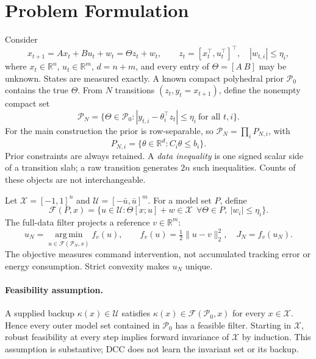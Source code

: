 \documentclass{l4dc2026}
\newcommand{\R}{\mathbb{R}}
\newcommand{\PN}{\mathcal P_N}
\newcommand{\U}{\mathcal U}
\newcommand{\X}{\mathcal X}
\newcommand{\F}{\mathcal F}
\newcommand{\argmin}{\operatorname*{arg\,min}}
\begin{document}
\section{Problem Formulation}
Consider
\begin{equation}\label{eq:dynamics}
 x_{t+1}=Ax_t+Bu_t+w_t=\Theta z_t+w_t,\qquad
 z_t=[x_t^\top,u_t^\top]^\top,\quad |w_{t,i}|\leq\eta_i,
\end{equation}
where $x_t\in\R^n$, $u_t\in\R^m$, $d=n+m$, and every entry of $\Theta=[A\ B]$ may be unknown. States are measured exactly. A known compact polyhedral prior $\mathcal P_0$ contains the true $\Theta$. From $N$ transitions $(z_t,y_t=x_{t+1})$, define the nonempty compact set
\begin{equation}\label{eq:set}
 \PN=\{\Theta\in\mathcal P_0:|y_{t,i}-\theta_i^\top z_t|\leq\eta_i\ \text{for all }t,i\}.
\end{equation}
For the main construction the prior is row-separable, so $\PN=\prod_i P_{N,i}$, with
\begin{equation}\label{eq:row}
 P_{N,i}=\{\theta\in\R^d:C_i\theta\leq b_i\}.
\end{equation}
Prior constraints are always retained. A \emph{data inequality} is one signed scalar side of a transition slab; a raw transition generates $2n$ such inequalities. Counts of these objects are not interchangeable.

Let $\X=[-1,1]^n$ and $\U=[-\bar u,\bar u]^m$. For a model set $P$, define
\begin{equation}\label{eq:feasible}
 \F(P,x)=\{u\in\U:\Theta[x;u]+w\in\X\ \ \forall\Theta\in P,\ |w_i|\leq\eta_i\}.
\end{equation}
The full-data filter projects a reference $v\in\R^m$:
\begin{equation}\label{eq:filter}
 u_N=\argmin_{u\in\F(\PN,x)}f_v(u),\qquad
 f_v(u)=\tfrac12\|u-v\|_2^2,\quad J_N=f_v(u_N).
\end{equation}
The objective measures command intervention, not accumulated tracking error or energy consumption. Strict convexity makes $u_N$ unique.

\paragraph{Feasibility assumption.}
A supplied backup $\kappa(x)\in\U$ satisfies $\kappa(x)\in\F(\mathcal P_0,x)$ for every $x\in\X$. Hence every outer model set contained in $\mathcal P_0$ has a feasible filter. Starting in $\X$, robust feasibility at every step implies forward invariance of $\X$ by induction. This assumption is substantive; DCC does not learn the invariant set or its backup.
\end{document}

